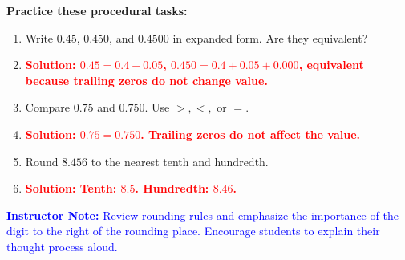 \documentclass[12pt]{article}
\begin{document}
\vspace{1em}

\begin{tcolorbox}[colframe=black!60, colback=white, 
coltitle=black, colbacktitle=black!15, fonttitle=\bfseries\Large, 
title=Exercises, halign title=center, left=10pt, right=10pt, top=10pt, bottom=15pt]
\textbf{Practice these procedural tasks:}
\begin{enumerate}[itemsep=2em]
    \item Write \( 0.45 \), \( 0.450 \), and \( 0.4500 \) in expanded form. Are they equivalent? 
    \item \textcolor{red}{\textbf{Solution: \( 0.45 = 0.4 + 0.05\), \( 0.450 = 0.4 + 0.05 + 0.000 \), equivalent because trailing zeros do not change value.}}
    
    \item Compare \( 0.75 \) and \( 0.750 \). Use \( >, <, \) or \( = \). 
    \item \textcolor{red}{\textbf{Solution: \( 0.75 = 0.750 \). Trailing zeros do not affect the value.}}
    
    \item Round \( 8.456 \) to the nearest tenth and hundredth.
    \item \textcolor{red}{\textbf{Solution: Tenth: \( 8.5 \). Hundredth: \( 8.46 \).}}
\end{enumerate}

\textcolor{blue}{\textbf{Instructor Note:} Review rounding rules and emphasize the importance of the digit to the right of the rounding place. Encourage students to explain their thought process aloud.}
\end{tcolorbox}

\vspace{1em}
\end{document}
